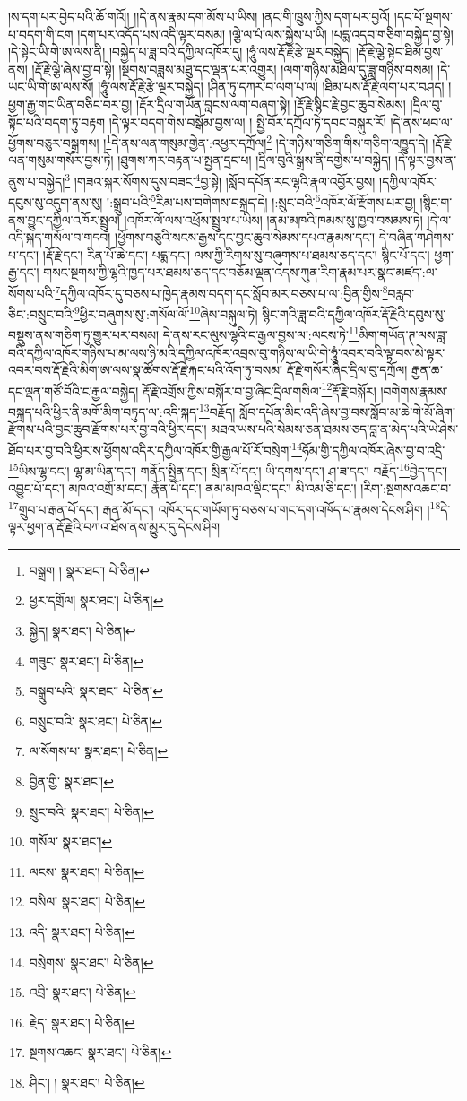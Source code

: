 །ས་དག་པར་བྱེད་པའི་ཆོ་གའོ།། །།དེ་ནས་རྣམ་དག་མོས་པ་ཡིས། །ནང་གི་ཁྲུས་ཀྱིས་དག་པར་བྱའོ། །དང་པོ་སྔགས་པ་བདག་གི་ངག །དག་པར་འདོད་པས་འདི་ལྟར་བསམ། །ལྕེ་ལ་པཾ་ལས་སྐྱེས་པ་ཡི། །པདྨ་འདབ་གཅིག་བསྐྱེད་བྱ་སྟེ། །དེ་སྟེང་ཡི་གེ་ཨ་ལས་ནི། །བསྐྱེད་པ་ཟླ་བའི་དཀྱིལ་འཁོར་དུ། །ཧཱུཾ་ལས་རྡོ་རྗེ་རྩེ་ལྔར་བསྐྱེད། །རྡོ་རྗེ་ལྕེ་སྟེང་ཐིམ་བྱས་ནས། །རྡོ་རྗེ་ལྕེ་ཞེས་བྱ་བ་སྟེ། །སྔགས་བཟླས་མཐུ་དང་ལྡན་པར་འགྱུར། །ལག་གཉིས་མཐིལ་དུ་ཟླ་གཉིས་བསམ། །དེ་ཡང་ཡི་གེ་ཨ་ལས་སོ། །ཧཱུཾ་ལས་རྡོ་རྗེ་རྩེ་ལྔར་བསྐྱེད། །ཤིན་ཏུ་དཀར་བ་ལག་པ་ལ། །ཐིམ་པས་རྡོ་རྗེ་ལག་པར་བཤད། །ཕྱག་རྒྱ་གང་ཡིན་བཅིང་བར་བྱ། །རྡོར་དྲིལ་གཡོན་བླངས་ལག་བཞག་སྟེ། །རྡོ་རྗེ་སྙིང་རྗེ་བྱང་ཆུབ་སེམས། །དྲིལ་བུ་སྟོང་པའི་བདག་ཏུ་བརྟག །དེ་ལྟར་བདག་གིས་བསྒོམ་བྱས་ལ། །
སྤྱི་བོར་དཀྲོལ་ཏེ་དབང་བསྐུར་རོ། །དེ་ནས་ཕབ་ལ་ཕྱོགས་བཅུར་བསྒྲགས། །\footnote{བསྒྲག །  སྣར་ཐང་།  པེ་ཅིན། }དེ་ནས་ལན་གསུམ་གྱེན་:འཕྱར་དཀྲོལ།\footnote{ཕྱར་དགྲོལ།  སྣར་ཐང་།  པེ་ཅིན། } །དེ་གཉིས་གཅིག་གིས་གཅིག་འཁྱུད་དེ། །རྡོ་རྗེ་ལན་གསུམ་གསོར་བྱས་ཏེ། །ཐུགས་ཀར་བརྟན་པ་སྤྱན་དྲང་པ། །དྲིལ་བུའི་སྒྲས་ནི་དགྱེས་པ་བསྐྱེད། །དེ་ལྟར་བྱས་ན་ནུས་པ་བསྐྱེད།\footnote{སྐྱེད།  སྣར་ཐང་།  པེ་ཅིན། } །གཟའ་སྐར་སོགས་དུས་བཟང་\footnote{གཟུང་  སྣར་ཐང་།  པེ་ཅིན། }བྱ་སྟེ། །སློབ་དཔོན་རང་ལྷའི་རྣལ་འབྱོར་བྱས། །དཀྱིལ་འཁོར་དབུས་སུ་འདུག་ནས་སུ། །:སྒྲུབ་པའི་\footnote{བསྒྲུབ་པའི་  སྣར་ཐང་།  པེ་ཅིན། }རིམ་པས་བགེགས་བསྐྲད་དེ། །:སྲུང་བའི་\footnote{བསྲུང་བའི་  སྣར་ཐང་།  པེ་ཅིན། }འཁོར་ལོ་རྫོགས་པར་བྱ། །སྙིང་ག་ནས་བྱུང་དཀྱིལ་འཁོར་སྤྲུལ། །འཁོར་ལོ་ལས་འཕྲོས་སྤྲུལ་པ་ཡིས། །ནམ་མཁའི་ཁམས་སུ་ཁྱབ་བསམས་ཏེ། །དེ་ལ་འདི་སྐད་གསོལ་བ་གདབ། །ཕྱོགས་བཅུའི་སངས་རྒྱས་དང་བྱང་ཆུབ་སེམས་དཔའ་རྣམས་དང་། དེ་བཞིན་གཤེགས་པ་དང་། །རྡོ་རྗེ་དང་། རིན་པོ་ཆེ་དང་། པདྨ་དང་། ལས་ཀྱི་རིགས་སུ་བཞུགས་པ་ཐམས་ཅད་དང་། སྙིང་པོ་དང་། ཕྱག་རྒྱ་དང་། གསང་སྔགས་ཀྱི་ལྷའི་ཁྱད་པར་ཐམས་ཅད་དང་བཅོམ་ལྡན་འདས་ཀུན་རིག་རྣམ་པར་སྣང་མཛད་:ལ་སོགས་པའི་\footnote{ལ་སོགས་པ་  སྣར་ཐང་།  པེ་ཅིན། }དཀྱིལ་འཁོར་དུ་བཅས་པ་ཁྱེད་རྣམས་བདག་དང་སློབ་མར་བཅས་པ་ལ་:བྱིན་གྱིས་\footnote{བྱིན་གྱི་  སྣར་ཐང་། }བརླབ་ཅིང་:བསྲུང་བའི་\footnote{སྲུང་བའི་  སྣར་ཐང་།  པེ་ཅིན། }ཕྱིར་བཞུགས་སུ་:གསོལ་ལོ་\footnote{གསོལ་  སྣར་ཐང་། }ཞེས་བསྐུལ་ཏེ། སྙིང་གའི་ཟླ་བའི་དཀྱིལ་འཁོར་རྡོ་རྗེའི་དབུས་སུ་བསྡུས་ནས་གཅིག་ཏུ་གྱུར་པར་བསམ། དེ་ནས་རང་ལུས་ལྷའི་ང་རྒྱལ་བྱས་ལ་:ལངས་ཏེ་\footnote{ལངས་  སྣར་ཐང་།  པེ་ཅིན། }མིག་གཡོན་ཊ་ལས་ཟླ་བའི་དཀྱིལ་འཁོར་གཉིས་པ་མ་ལས་ཉི་མའི་དཀྱིལ་འཁོར་འབྲས་བུ་གཉིས་ལ་ཡི་གེ་ཧཱུཾ་འབར་བའི་ལྟ་བས་མེ་ལྟར་འབར་བས་རྡོ་རྗེའི་མིག་ཨ་ལས་སྣ་ཚོགས་རྡོ་རྗེ་རྐང་པའི་འོག་ཏུ་བསམ། རྡོ་རྗེ་གསོར་ཞིང་དྲིལ་བུ་དཀྲོལ། རྒྱན་ཆ་དང་ལྡན་གཙོ་བོའི་ང་རྒྱལ་བསྐྱེད། རྡོ་རྗེ་འགྲོས་ཀྱིས་བསྐོར་བ་བྱ་ཞིང་དྲིལ་གསིལ་\footnote{བསིལ་  སྣར་ཐང་།  པེ་ཅིན། }རྡོ་རྗེ་བསྐོར། །བགེགས་རྣམས་བསྐྲད་པའི་ཕྱིར་ནི་མགོ་མིག་བཏུད་ལ་:འདི་སྐད་\footnote{འདི་  སྣར་ཐང་།  པེ་ཅིན། }བརྗོད། སློབ་དཔོན་མིང་འདི་ཞེས་བྱ་བས་སློབ་མ་ཆེ་གེ་མོ་ཞིག་རྫོགས་པའི་བྱང་ཆུབ་རྫོགས་པར་བྱ་བའི་ཕྱིར་དང་། མཐའ་ཡས་པའི་སེམས་ཅན་ཐམས་ཅད་བླ་ན་མེད་པའི་ཡེ་ཤེས་ཐོབ་པར་བྱ་བའི་ཕྱིར་ས་ཕྱོགས་འདིར་དཀྱིལ་འཁོར་གྱི་རྒྱལ་པོ་རོ་བསྲེག་\footnote{བསྲེགས་  སྣར་ཐང་།  པེ་ཅིན། }ཧོམ་གྱི་དཀྱིལ་འཁོར་ཞེས་བྱ་བ་འདྲི་\footnote{འབྲི་  སྣར་ཐང་།  པེ་ཅིན། }ཡིས་ལྷ་དང་། ལྷ་མ་ཡིན་དང་། གནོད་སྤྱིན་དང་། སྲིན་པོ་དང་། ཡི་དགས་དང་། ཤ་ཟ་དང་། བརྗོད་\footnote{རྗེད་  སྣར་ཐང་།  པེ་ཅིན། }བྱེད་དང་། འབྱུང་པོ་དང་། མཁའ་འགྲོ་མ་དང་། རྣོན་པོ་དང་། ནམ་མཁའ་ལྡིང་དང་། མི་འམ་ཅི་དང་། །རིག་:སྔགས་འཆང་བ་\footnote{སྔགས་འཆང་  སྣར་ཐང་།  པེ་ཅིན། }གྲུབ་པ་རྒན་པོ་དང་། རྒན་མོ་དང་། འཁོར་དང་གཡོག་ཏུ་བཅས་པ་གང་དག་འཁོད་པ་རྣམས་དེངས་ཤིག །\footnote{ཤིང་། །  སྣར་ཐང་།  པེ་ཅིན། }དེ་ལྟར་ཕྱག་ན་རྡོ་རྗེའི་བཀའ་ཐོས་ནས་མྱུར་དུ་དེངས་ཤིག 